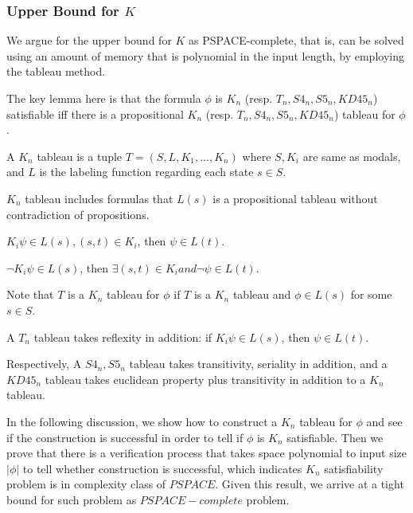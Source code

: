 \documentclass{article}
\begin{document}
\subsubsection{Upper Bound for $K$}
\par We argue for the upper bound for $K$ as PSPACE-complete, that is, can be solved using an amount of memory that is polynomial in the input length, by employing the tableau method.
\par The key lemma here is that the formula $\phi$ is $K_n$ (resp. $T_n,S4_n,S5_n,KD45_n$) satisfiable iff there is a propositional $K_n$ (resp. $T_n,S4_n,S5_n,KD45_n$) tableau for $\phi$.
\par A $K_n$ tableau is a tuple $T=(S,L,K_1,...,K_n)$ where $S,K_i$ are same as modals, and $L$ is the labeling function regarding each state $s\in S$.
\par $K_n$ tableau includes formulas that $L(s)$ is a propositional tableau without contradiction of propositions.
\par $K_i \psi \in L(s), (s,t)\in K_i$, then $\psi \in L(t)$.
\par $\lnot K_i \psi \in L(s)$, then $\exists (s,t)\in K_i and \lnot \psi \in L(t)$.
\par Note that $T$ is a $K_n$ tableau for $\phi$ if $T$ is a $K_n$ tableau and $\phi \in L(s)$ for some $s\in S$. 
\par A $T_n$ tableau takes reflexity in addition: if $K_i \psi \in L(s)$, then $\psi \in L(t)$.
\par Respectively, A $S4_n, S5_n$ tableau takes transitivity, seriality in addition, and a $KD45_n$ tableau takes euclidean property plus transitivity in addition to a $K_n$ tableau.
\par In the following discussion, we show how to construct a $K_n$ tableau for $\phi$ and see if the construction is successful in order to tell if $\phi$ is $K_n$ satisfiable. Then we prove that there is a verification process that takes space polynomial to input size $|\phi|$ to tell whether construction is successful, which indicates $K_n$ satisfiability problem is in complexity class of $PSPACE$. Given this result, we arrive at a tight bound for such problem as $PSPACE-complete$ problem.
\end{document}
